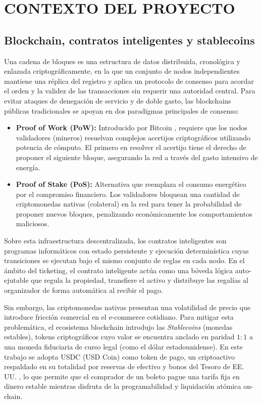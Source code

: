 \newpage
\setcounter{subsection}{0}
\section{CONTEXTO DEL PROYECTO}

\subsection{Blockchain, contratos inteligentes y stablecoins}

Una cadena de bloques es una estructura de datos distribuida, cronológica y enlazada criptográficamente, en
la que 
un conjunto de nodos independientes mantiene una réplica del registro y aplica un protocolo de consenso para
acordar 
el orden y la validez de las transacciones sin requerir una autoridad central. Para evitar ataques de
denegación de 
servicio y de doble gasto, las blockchains públicas tradicionales se apoyan en dos paradigmas principales de
consenso:

\begin{itemize}
    \item \textbf{Proof of Work (PoW):} Introducido por Bitcoin \cite{nakamoto2008bitcoin}, requiere que los
nodos 
    validadores (mineros) resuelvan complejos acertijos criptográficos utilizando potencia de cómputo. El
primero 
    en resolver el acertijo tiene el derecho de proponer el siguiente bloque, asegurando la red a través del
gasto intensivo de energía.

    \item \textbf{Proof of Stake (PoS):} Alternativa que reemplaza el consumo energético por el compromiso
financiero. 
    Los validadores bloquean una cantidad de criptomonedas nativas (colateral) en la red para tener la
probabilidad de proponer 
    nuevos bloques, penalizando económicamente los comportamientos maliciosos.
\end{itemize}

Sobre esta infraestructura descentralizada, los contratos inteligentes son programas informáticos con estado
persistente 
y ejecución determinística cuyas transiciones se ejecutan bajo el mismo conjunto de reglas en cada nodo. En
el ámbito del 
ticketing, el contrato inteligente actúa como una bóveda lógica auto-ejutable que regula la propiedad,
transfiere el activo 
y distribuye las regalías al organizador de forma automática al recibir el pago.

Sin embargo, las criptomonedas nativas presentan una volatilidad de precio que introduce fricción comercial
en el e-commerce 
cotidiano. Para mitigar esta problemática, el ecosistema blockchain introdujo las \textit{Stablecoins}
(monedas estables), 
tokens criptográficos cuyo valor se encuentra anclado en paridad $1:1$ a una moneda fiduciaria de curso legal 
(como el dólar estadounidense). En este trabajo se adopta USDC (USD Coin) como token de pago, un criptoactivo
respaldado 
en su totalidad por reservas de efectivo y bonos del Tesoro de EE. UU. \cite{sdf2024stablecoins}, lo que
permite que el comprador 
de un boleto pague una tarifa fija en dinero estable mientras disfruta de la programabilidad y liquidación
atómica on-chain.


